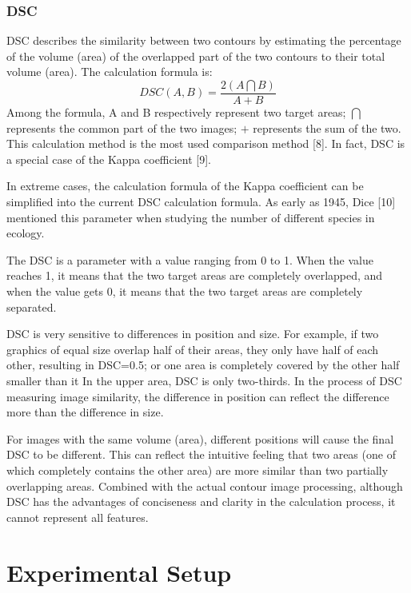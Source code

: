 \documentclass[conference]{IEEEtran}
\begin{document}
\subsubsection{DSC}
DSC describes the similarity between two contours by estimating the percentage of the volume (area) of the overlapped part of the two contours to their total volume (area). The calculation formula is:
\begin{equation}
DSC(A,B) = \frac{2(A\bigcap B)}{A+B}
\end{equation}
Among the formula, A and B respectively represent two target areas; $\bigcap$ represents the common part of the two images; $+$ represents the sum of the two. This calculation method is the most used comparison method [8]. In fact, DSC is a special case of the Kappa coefficient [9]. 

In extreme cases, the calculation formula of the Kappa coefficient can be simplified into the current DSC calculation formula. As early as 1945, Dice [10] mentioned this parameter when studying the number of different species in ecology.

The DSC is a parameter with a value ranging from 0 to 1. When the value reaches 1, it means that the two target areas are completely overlapped, and when the value gets 0, it means that the two target areas are completely separated.

DSC is very sensitive to differences in position and size. 
For example, if two graphics of equal size overlap half of their areas, they only have half of each other, resulting in DSC=0.5; 
or one area is completely covered by the other half smaller than it In the upper area, DSC is only two-thirds. 
In the process of DSC measuring image similarity, the difference in position can reflect the difference more than the difference in size. 

For images with the same volume (area), different positions will cause the final DSC to be different. 
This can reflect the intuitive feeling that two areas (one of which completely contains the other area) are more similar than two partially overlapping areas. 
Combined with the actual contour image processing, although DSC has the advantages of conciseness and clarity in the calculation process, it cannot represent all features.



\section{Experimental Setup}
\end{document}
